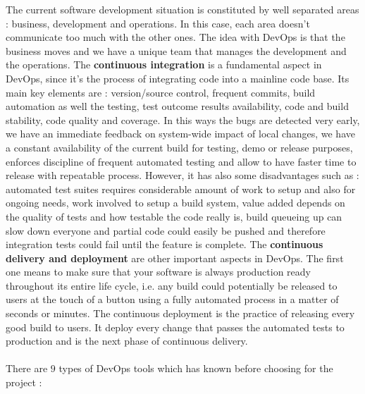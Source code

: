 \documentclass[11pt]{article}
\begin{document}
The current software development situation is constituted by well separated areas : business, development and operations. In this case, each area doesn't communicate too much with the other ones. The idea with DevOps is that the business moves and we have a unique team that manages the development and the operations. The \textbf{continuous integration} is a fundamental aspect in DevOps, since it's the process of integrating code into a mainline code base. Its main key elements are : version/source control, frequent commits, build automation as well the testing, test outcome results availability, code and build stability, code quality and coverage. In this ways the bugs are detected very early, we have an immediate feedback on system-wide impact of local changes, we have a constant availability of the current build for testing, demo or release purposes, enforces discipline of frequent automated testing and allow to have faster time to release with repeatable process. However, it has also some disadvantages such as : automated test suites requires considerable amount of work to setup and also for ongoing needs, work involved to setup a build system, value added depends on the quality of tests and how testable the code really is, build queueing up can slow down everyone and partial code could easily be pushed and therefore integration tests could fail until the feature is complete. The \textbf{continuous delivery and deployment} are other important aspects in DevOps. The first one means to make sure that your software is always production ready throughout its entire life cycle, i.e. any build could potentially be released to users at the touch of a button using a fully automated process in a matter of seconds or minutes. The continuous deployment is the practice of releasing every good build to users. It deploy every change that passes the automated tests to production and is the next phase of continuous delivery.\\\\There are $9$ types of DevOps tools which has known before choosing for the project :
\end{document}

